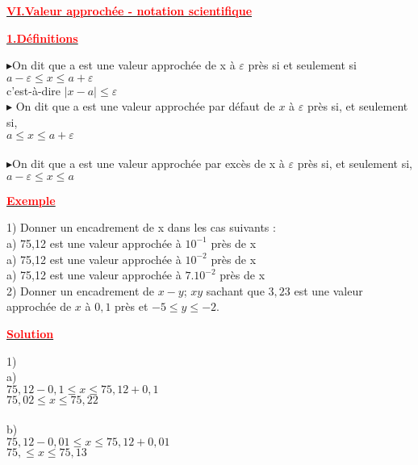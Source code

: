 \documentclass[12pt]{article}
\begin{document}
\begin{center}
\underline{\textbf{\textcolor{red}{VI.Valeur approchée - notation scientifique}}}\\
\end{center} 
\begin{center}
\underline{\textbf{\textcolor{red}{1.Définitions }}}\\
\end{center}
$\blacktriangleright$On dit que a est une valeur approchée de x à $\varepsilon$ près si et seulement si 
$a-\varepsilon\leqslant x \leqslant a+\varepsilon$\\ c'est-à-dire $\mid x-a \mid \leqslant\varepsilon$\\
$\blacktriangleright$ On dit que a est une valeur approchée par défaut de $x$ à $\varepsilon$ près si, et seulement si,\\ $a \leqslant x \leqslant a+\varepsilon$ \\
\\
$\blacktriangleright$On dit que a est une valeur approchée par excès de x à $\varepsilon$ près si, et seulement si,\\
$a-\varepsilon\leqslant x \leqslant a$
\begin{center}
\underline{\textbf{\textcolor{red}{Exemple}}}\\
\end{center} 
1) Donner un encadrement de x dans les cas suivants :\\
a) 75,12 est une valeur approchée à $10^{-1}$ près de x\\
a) 75,12 est une valeur approchée à $10^{-2}$ près de x\\
a) 75,12 est une valeur approchée à $7.10^{-2}$ près de x\\
2) Donner un encadrement de $x-y$; $xy$ sachant que $3,23$ est une valeur approchée de 
$x$ à $0,1$ près et $-5\leqslant y \leqslant -2$.\\
\begin{center}
\underline{\textbf{\textcolor{red}{Solution}}}\\
\end{center}
1)\\a)
\\
$75,12-0,1\leq x \leq 75,12+0,1$\\
$75,02\leq x \leq 75,22$\\
\\
b)\\
$75,12-0,01\leq x \leq 75,12+0,01$\\
$75,\leq x \leq 75,13$\\
\end{document}

